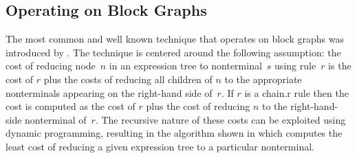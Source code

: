 


\subsection{Operating on Block Graphs}

The most common and well known technique that operates on \glspl{block graph}
was introduced by \textcite{AhoEtAl:1989}.
%
The technique is centered around the following assumption: the cost of reducing
node~$n$ in an \gls{expression tree} to \gls{nonterminal}~$s$ using
\gls{rule}~$r$ is the cost of $r$ plus the costs of reducing all children of $n$
to the appropriate \glspl{nonterminal} appearing on the right-hand side of~$r$.
%
If $r$ is a \gls{chain.r} \gls{rule} then the cost is computed as the cost of
$r$ plus the cost of reducing $n$ to the right-hand-side \gls{nonterminal}
of~$r$.
%
The recursive nature of these costs can be exploited using dynamic programming,
resulting in the algorithm shown in  which
computes the least cost of reducing a given \gls{expression tree} to a
particular \gls{nonterminal}.

